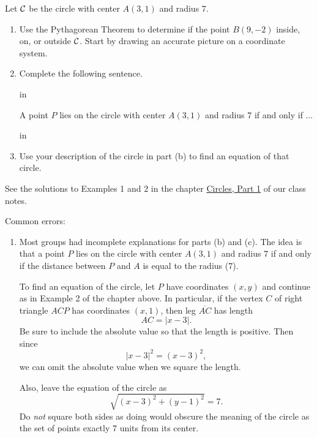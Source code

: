 \documentclass{ximera}
\newcommand{\pskip}{\vskip 0.1 in}
\begin{document}
\begin{question} \label{Qodf3mr333}
Let ${\cal C}$ be the circle with center $A(3,1)$ and radius $7$.

\begin{enumerate}
\item Use the Pythagorean Theorem to determine if the point $B(9,-2)$ inside, on, or outside ${\cal C}$. Start by drawing an accurate picture on a coordinate system.

\item Complete the following sentence.

\pskip

A point $P$ lies on the circle with center $A(3,1)$ and radius $7$ if and only if ...

\pskip

\item Use your description of the circle in part (b) to find an equation of that circle.

\end{enumerate}

\begin{explanation}
See the solutions to Examples 1 and 2 in the chapter \href{https://ximera.osu.edu/precalc1/PreCalculus1/Circles/Circles}{Circles, Part 1} of our class notes.

Common errors:

\begin{enumerate}
\item Most groups had incomplete explanations for parts (b) and (c). The idea is that a point $P$ lies on the circle with center $A(3,1)$ and radius $7$ if and only if the distance between $P$ and $A$ is equal to the radius ($7$). 

To find an equation of the circle, let $P$ have coordinates $(x,y)$ and continue as in Example 2 of the chapter above. In particular, if the vertex $C$ of right triangle $ACP$ has coordinates $(x,1)$, then leg $\overline{AC}$ has length
\[
   AC = | x-3 |.
\]
Be sure to include the absolute value so that the length is positive. Then since
\[
      |x-3|^2 = (x-3)^2,
\]
we can omit the absolute value when we square the length. 

Also, leave the equation of the circle as
\[
    \sqrt{(x-3)^2 + (y-1)^2} = 7.
\] 
Do \emph{not} square both sides as doing would obscure the meaning of the circle as the set of points exactly 7 units from its center. 
\end{enumerate}

\end{explanation}
\end{question}
\end{document}
